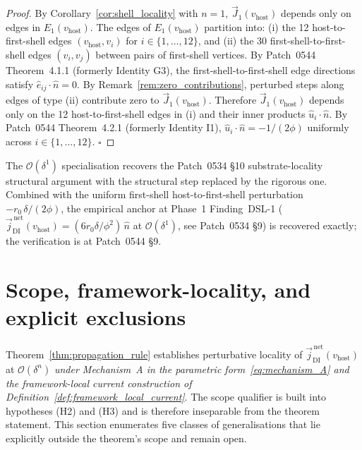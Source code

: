 \documentclass[11pt,letterpaper]{article}
\newcommand{\nhat}{\hat{n}}
\newcommand{\vhost}{v_{\text{host}}}
\newcommand{\jDInet}{\vec{j}_{\text{DI}}^{\,\text{net}}}
\newcommand{\Eorder}[1]{\mathcal{O}(\delta^{#1})}
\begin{document}
\begin{proof}
By Corollary~\ref{cor:shell_locality} with $n = 1$, $\vec{J}_1(\vhost)$ depends only on edges in $E_1(\vhost)$. The edges of $E_1(\vhost)$ partition into: (i) the 12 host-to-first-shell edges $(\vhost, v_i)$ for $i \in \{1, \ldots, 12\}$, and (ii) the 30 first-shell-to-first-shell edges $(v_i, v_j)$ between pairs of first-shell vertices. By Patch~0544 Theorem~4.1.1 (formerly Identity G3), the first-shell-to-first-shell edge directions satisfy $\hat{e}_{ij}\cdot\nhat = 0$. By Remark~\ref{rem:zero_contributions}, perturbed steps along edges of type (ii) contribute zero to $\vec{J}_1(\vhost)$. Therefore $\vec{J}_1(\vhost)$ depends only on the 12 host-to-first-shell edges in (i) and their inner products $\hat{u}_i\cdot\nhat$. By Patch~0544 Theorem~4.2.1 (formerly Identity I1), $\hat{u}_i\cdot\nhat = -1/(2\phi)$ uniformly across $i \in \{1, \ldots, 12\}$. $\square$
\end{proof}

The $\Eorder{1}$ specialisation recovers the Patch~0534 \S10 substrate-locality structural argument with the structural step replaced by the rigorous one. Combined with the uniform first-shell host-to-first-shell perturbation $-r_0\,\delta/(2\phi)$, the empirical anchor at Phase~1 Finding~DSL-1 ($\jDInet(\vhost) = (6 r_0 \delta/\phi^2)\,\nhat$ at $\Eorder{1}$, see Patch~0534 \S9) is recovered exactly; the verification is at Patch~0544 \S9.

\section{Scope, framework-locality, and explicit exclusions}\label{sec:scope_and_exclusions}

Theorem~\ref{thm:propagation_rule} establishes perturbative locality of $\jDInet(\vhost)$ at $\Eorder{n}$ \emph{under Mechanism~A in the parametric form~\eqref{eq:mechanism_A} and the framework-local current construction of Definition~\ref{def:framework_local_current}}. The scope qualifier is built into hypotheses (H2) and (H3) and is therefore inseparable from the theorem statement. This section enumerates five classes of generalisations that lie explicitly outside the theorem's scope and remain open.
\end{document}
